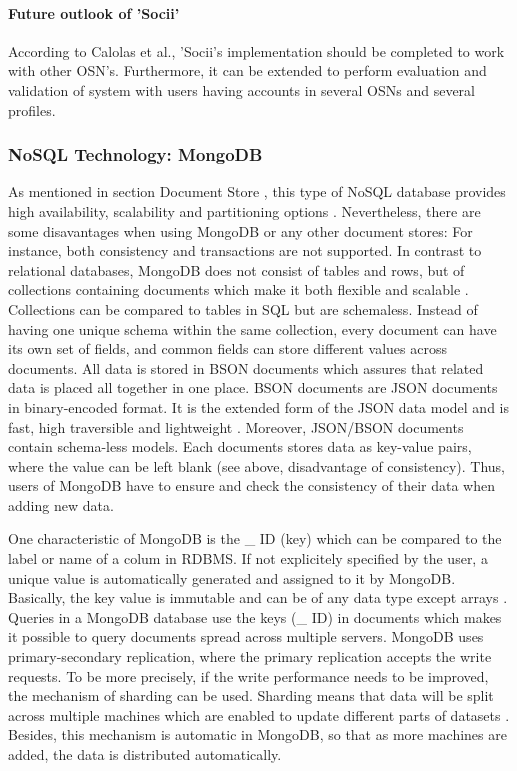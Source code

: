 \paragraph{Future outlook of 'Socii'}

According to Calolas et al., 'Socii's implementation should be completed to work with other OSN's. Furthermore, it can be extended to perform evaluation and validation of system with users having accounts in several OSNs and several profiles. 

\subsubsection{NoSQL Technology: MongoDB}\label{mongodb}

As mentioned in section Document Store \pageref{documentstore}, this type of NoSQL database provides high availability, scalability and partitioning options \cite[p.25 ff.]{mongodb_edward}. Nevertheless, there are some disavantages when using MongoDB or any other document stores: For instance, both consistency and transactions are not supported. 
In contrast to relational databases, MongoDB does not consist of tables and rows, but of collections containing documents which make it both flexible and scalable \cite[p.25 ff.]{mongodb_edward}. Collections can be compared to tables in SQL but are schemaless. Instead of having one unique schema within the same collection, every document can have its own set of fields, and common fields can store different values across documents.  
All data is stored in \ac{BSON} documents which assures that related data is placed all together in one place. BSON documents are JSON documents in binary-encoded format. It is the extended form of the JSON data model and is fast, high traversible and lightweight \cite[p.31 ff.]{mongodb_edward}. Moreover, JSON/BSON documents contain schema-less models. Each documents stores data as key-value pairs, where the value can be left blank (see above, disadvantage of consistency). Thus, users of MongoDB have to ensure and check the consistency of their data when adding new data.

One characteristic of MongoDB is the {\_} ID (key) which can be compared to the label or name of a colum in RDBMS. If not explicitely specified by the user, a unique value is automatically generated and assigned  to it by MongoDB. Basically, the key value is immutable and can be of any data type except arrays \cite[p.31 ff.]{mongodb_edward}.
Queries in a MongoDB database use the keys ({\_} ID) in documents which makes it possible to query documents spread across multiple servers. 
MongoDB uses primary-secondary replication, where the primary replication accepts the write requests. To be more precisely, if the write performance needs to be improved, the mechanism of sharding can be used. Sharding means that data will be split across multiple machines which are enabled to update different parts of datasets \cite[p.25 ff.]{mongodb_edward}. Besides, this mechanism is automatic in MongoDB, so that as more machines are added, the data is distributed automatically.

